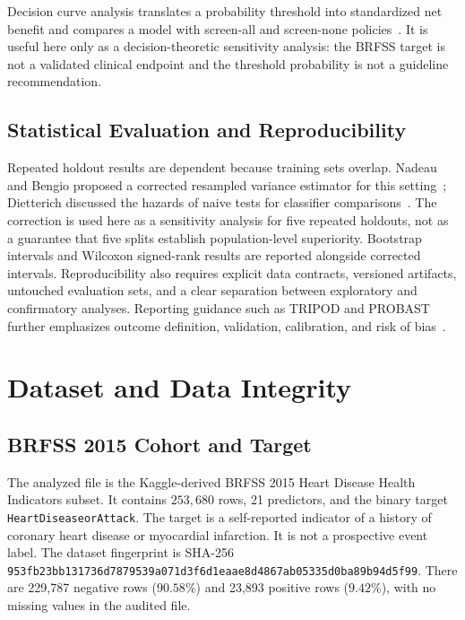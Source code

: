 \documentclass[conference,10pt]{IEEEtran}
\begin{document}
Decision curve analysis translates a probability threshold into standardized net benefit and compares a model with screen-all and screen-none policies~\cite{vickers2006decision}. It is useful here only as a decision-theoretic sensitivity analysis: the BRFSS target is not a validated clinical endpoint and the threshold probability is not a guideline recommendation.

\subsection{Statistical Evaluation and Reproducibility}
Repeated holdout results are dependent because training sets overlap. Nadeau and Bengio proposed a corrected resampled variance estimator for this setting~\cite{nadeau2003inference}; Dietterich discussed the hazards of naive tests for classifier comparisons~\cite{dietterich1998approximate}. The correction is used here as a sensitivity analysis for five repeated holdouts, not as a guarantee that five splits establish population-level superiority. Bootstrap intervals and Wilcoxon signed-rank results are reported alongside corrected intervals. Reproducibility also requires explicit data contracts, versioned artifacts, untouched evaluation sets, and a clear separation between exploratory and confirmatory analyses. Reporting guidance such as TRIPOD and PROBAST further emphasizes outcome definition, validation, calibration, and risk of bias~\cite{collins2015tripod,wolff2019probast}.

\section{Dataset and Data Integrity}
\subsection{BRFSS 2015 Cohort and Target}
The analyzed file is the Kaggle-derived BRFSS 2015 Heart Disease Health Indicators subset. It contains $253{,}680$ rows, 21 predictors, and the binary target \texttt{HeartDiseaseorAttack}. The target is a self-reported indicator of a history of coronary heart disease or myocardial infarction. It is not a prospective event label. The dataset fingerprint is SHA-256 \texttt{953fb23bb131736d7879539a071d3f6d1eaae8d4867ab05335d0ba89b94d5f99}. There are 229,787 negative rows ($90.58\%$) and 23,893 positive rows ($9.42\%$), with no missing values in the audited file.
\end{document}
